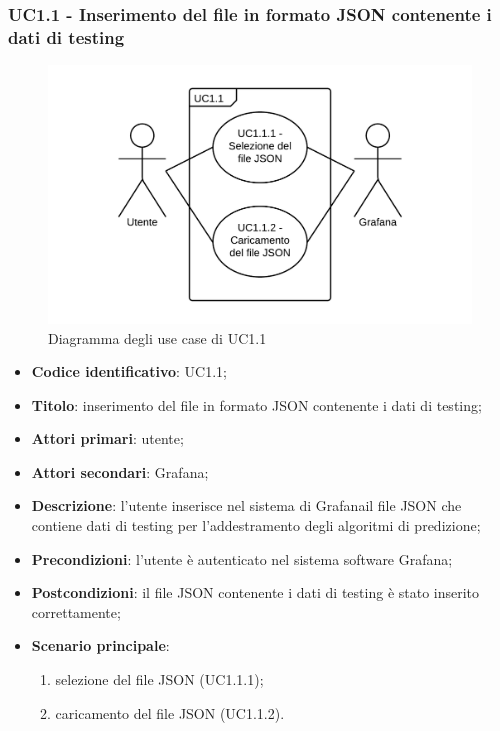 \subsubsection{UC1.1 - Inserimento del file in formato JSON contenente i dati di testing}
\begin{figure}[H]
\includegraphics{img/UC1_1_-_Inserimento_del_file_in_formato_JSON_contenente_i_dati_di_testing.png}
\caption{Diagramma degli use case di UC1.1}
\end{figure}
\begin{itemize}
	\item \textbf{Codice identificativo}: UC1.1;
	\item \textbf{Titolo}: inserimento del file in formato JSON contenente i dati di testing;
	\item \textbf{Attori primari}: utente;
	\item \textbf{Attori secondari}: Grafana\glo;
	\item \textbf{Descrizione}: l'utente inserisce nel sistema di Grafana\glosp il file JSON che contiene dati di testing per l'addestramento degli algoritmi di predizione;
	\item \textbf{Precondizioni}: l'utente è autenticato nel sistema software Grafana\glo;
	\item \textbf{Postcondizioni}: il file JSON contenente i dati di testing è stato inserito correttamente;
	\item \textbf{Scenario principale}:
		\begin{enumerate}
			\item selezione del file JSON (UC1.1.1);
			\item caricamento del file JSON (UC1.1.2).
		\end{enumerate}
\end{itemize}

